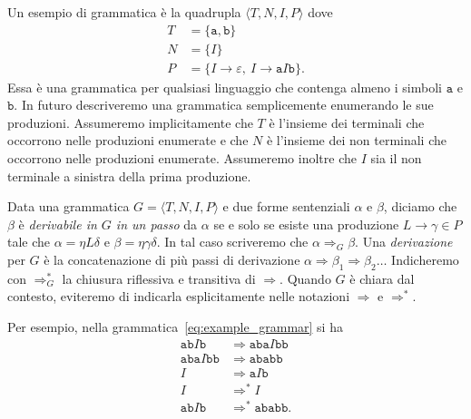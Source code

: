 Un esempio di grammatica \`e la quadrupla $\langle T,N,I,P\rangle$ dove
%
\begin{equation}\label{eq:example_grammar}
\begin{split}
  T &= \{\mathtt{a},\mathtt{b}\}\\
  N &= \{I\}\\
  P &= \{I\to\varepsilon,\ I\to\mathtt{a}I\mathtt{b}\}.
\end{split}
\end{equation}
%
Essa \`e una grammatica per qualsiasi linguaggio che contenga almeno i simboli
$\mathtt{a}$ e $\mathtt{b}$. In futuro descriveremo una grammatica
semplicemente enumerando le sue produzioni. Assumeremo implicitamente
che $T$ \`e l'insieme dei terminali che occorrono nelle produzioni enumerate
e che $N$ \`e l'insieme dei non terminali che occorrono nelle produzioni
enumerate. Assumeremo inoltre che $I$ sia il non terminale a sinistra della
prima produzione.
%
\begin{definition}[Derivazione]\label{def:derivation}
Data una grammatica $G=\langle T,N,I,P\rangle$ e due forme sentenziali
$\alpha$ e $\beta$, diciamo che $\beta$ \`e
\emph{derivabile in $G$ in un passo}
da $\alpha$ se e solo se esiste una produzione
$L\to\gamma\in P$ tale che $\alpha=\eta L\delta$ e $\beta=\eta\gamma\delta$.
In tal caso scriveremo che $\alpha\Rightarrow_G\beta$.
Una \emph{derivazione} per $G$ \`e la concatenazione di pi\`u passi
di derivazione $\alpha\Rightarrow\beta_1\Rightarrow\beta_2\ldots$
Indicheremo con
$\Rightarrow^*_G$ la chiusura riflessiva e transitiva di $\Rightarrow$.
Quando $G$ \`e chiara dal contesto, eviteremo di indicarla esplicitamente
nelle notazioni $\Rightarrow$ e $\Rightarrow^*$.
\end{definition}
%
\noindent
Per esempio, nella grammatica~\eqref{eq:example_grammar} si ha
%
\begin{align*}
  \mathtt{ab}I\mathtt{b}&\Rightarrow\mathtt{aba}I\mathtt{bb}\\
  \mathtt{aba}I\mathtt{bb}&\Rightarrow\mathtt{ababb}\\
  I&\Rightarrow\mathtt{a}I\mathtt{b}\\
  I&\Rightarrow^*I\\
  \mathtt{ab}I\mathtt{b}&\Rightarrow^*\mathtt{ababb}.
\end{align*}

